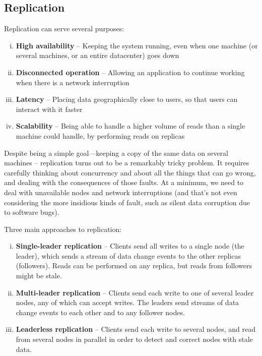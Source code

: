 \documentclass{article}
\begin{document}
    \subsection{Replication}
    Replication can serve several purposes:
    \begin{enumerate}[i.]
        \item \textbf{High availability} --  Keeping the system running, even when one machine (or several machines, or an  entire datacenter) goes down
        
        \item \textbf{Disconnected operation} -- Allowing an application to continue working when there is a network interruption
        
        \item \textbf{Latency} -- Placing data geographically close to users, so that users can interact with it faster

        \item \textbf{Scalability} -- Being able to handle a higher volume of reads than a single machine could handle, by performing reads on replicas
    \end{enumerate}
        
    Despite being a simple goal—keeping a copy of the same data on several machines -- replication turns out to be a remarkably tricky problem. It requires carefully thinking about concurrency and about all the things that can go wrong, and dealing with the consequences of those faults. At a minimum, we need to deal with unavailable nodes and network interruptions (and that’s not even considering the more insidious kinds of fault, such as silent data corruption due to software bugs).
        
    Three main approaches to replication:
    \begin{enumerate}[i.]
        \item \textbf{Single-leader replication} -- Clients send all writes to a single node (the leader), which sends a stream of data change events to the other replicas (followers). Reads can be performed on any replica, but reads from followers might be stale.
        
        \item \textbf{Multi-leader replication} -- Clients send each write to one of several leader nodes, any of which can accept writes. The leaders send streams of data change events to each other and to any follower nodes.
        
        \item \textbf{Leaderless replication} -- Clients send each write to several nodes, and read from several nodes in parallel in order to detect and correct nodes with stale data.
    \end{enumerate}
    
\end{document}
